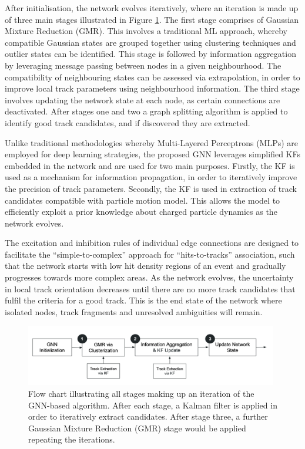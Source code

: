 After initialisation, the network evolves iteratively, where an iteration is made up of three main stages illustrated in Figure \ref{fig:flowchart}. The first stage comprises of Gaussian Mixture Reduction (GMR). This involves a traditional ML approach, whereby compatible Gaussian states are grouped together using clustering techniques and outlier states can be identified. This stage is followed by information aggregation by leveraging message passing between nodes in a given neighbourhood. The compatibility of neighbouring states can be assessed via extrapolation, in order to improve local track parameters using neighbourhood information. The third stage involves updating the network state at each node, as certain connections are deactivated. After stages one and two a graph splitting algorithm is applied to identify good track candidates, and if discovered they are extracted. 

Unlike traditional methodologies whereby Multi-Layered Perceptrons (MLPs) are employed for deep learning strategies, the proposed GNN leverages simplified KFs embedded in the network and are used for two main purposes. Firstly, the KF is used as a mechanism for information propagation, in order to iteratively improve the precision of track parameters. Secondly, the KF is used in extraction of track candidates compatible with particle motion model. This allows the model to efficiently exploit a prior knowledge about charged particle dynamics as the network evolves.

The excitation and inhibition rules of individual edge connections are designed to facilitate the “simple-to-complex” approach for “hits-to-tracks” association, such that the network starts with low hit density regions of an event and gradually progresses towards more complex areas. As the network evolves, the uncertainty in local track orientation decreases until there are no more track candidates that fulfil the criteria for a good track. This is the end state of the network where isolated nodes, track fragments and unresolved ambiguities will remain.

\begin{figure}[htbp]
    \centering
    \includegraphics[width=0.98\textwidth]{images/5-gnn-algorithm/gnn-workflow.png}
    \caption{Flow chart illustrating all stages making up an iteration of the GNN-based algorithm. After each stage, a Kalman filter is applied in order to iteratively extract candidates. After stage three, a further Gaussian Mixture Reduction (GMR) stage would be applied repeating the iterations.}
    \label{fig:flowchart}%
\end{figure}




